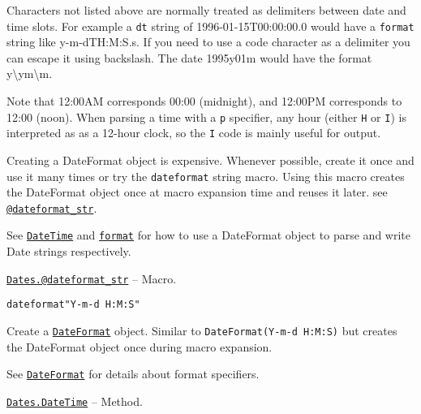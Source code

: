 \begin{adjustwidth}{2em}{0pt}
\begin{table}[h]
\end{table}

Characters not listed above are normally treated as delimiters between date and time slots. For example a \texttt{dt} string of {\textquotedbl}1996-01-15T00:00:00.0{\textquotedbl} would have a \texttt{format} string like {\textquotedbl}y-m-dTH:M:S.s{\textquotedbl}. If you need to use a code character as a delimiter you can escape it using backslash. The date {\textquotedbl}1995y01m{\textquotedbl} would have the format {\textquotedbl}y{\textbackslash}ym{\textbackslash}m{\textquotedbl}.

Note that 12:00AM corresponds 00:00 (midnight), and 12:00PM corresponds to 12:00 (noon). When parsing a time with a \texttt{p} specifier, any hour (either \texttt{H} or \texttt{I}) is interpreted as as a 12-hour clock, so the \texttt{I} code is mainly useful for output.

Creating a DateFormat object is expensive. Whenever possible, create it once and use it many times or try the \texttt{dateformat{\textquotedbl}{\textquotedbl}} string macro. Using this macro creates the DateFormat object once at macro expansion time and reuses it later. see \hyperlink{10511139750795822255}{\texttt{@dateformat\_str}}.

See \hyperlink{17572689933274889838}{\texttt{DateTime}} and \hyperlink{10034586459080834693}{\texttt{format}} for how to use a DateFormat object to parse and write Date strings respectively.



\end{adjustwidth}
\hypertarget{10511139750795822255}{}
\hyperlink{10511139750795822255}{\texttt{Dates.@dateformat\_str}}  -- {Macro.}

\begin{adjustwidth}{2em}{0pt}


\begin{verbatim}
dateformat"Y-m-d H:M:S"
\end{verbatim}

Create a \hyperlink{18093459443158853001}{\texttt{DateFormat}} object. Similar to \texttt{DateFormat({\textquotedbl}Y-m-d H:M:S{\textquotedbl})} but creates the DateFormat object once during macro expansion.

See \hyperlink{18093459443158853001}{\texttt{DateFormat}} for details about format specifiers.



\end{adjustwidth}
\hypertarget{14458628653295259798}{}
\hyperlink{14458628653295259798}{\texttt{Dates.DateTime}}  -- {Method.}

